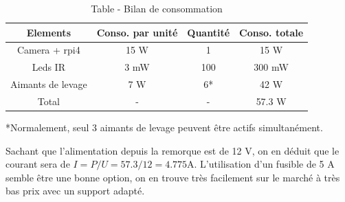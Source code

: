 \begin{table}[H]
    \begin{center}
        \caption{Table - Bilan de consommation}
        \begin{tabular}{|c|c|c|c|}
            Elements            & Conso. par unité   & Quantité & Conso. totale        \\ \hline
            Camera + \Gls{rpi4} & 15 \si{\watt}      & 1        & 15    \si{\watt}     \\
            Leds IR             & 3 \si{\milli\watt} & 100      & 300 \si{\milli\watt} \\
            Aimants de levage   & 7 \si{\watt}       & 6*       & 42 \si{\watt}        \\
            Total               & -                  & -        & 57.3 \si{\watt}      \\
        \end{tabular}
    \end{center}

    *Normalement, seul 3 aimants de levage peuvent être actifs simultanément.
\end{table}

Sachant que l'alimentation depuis la remorque est de 12 \si{\volt}, on en déduit que le courant sera de \(I = P/U = 57.3/12 = 4.775 \si{\ampere} \).
L'utilisation d'un fusible de 5 \si{\ampere} semble être une bonne option, on en trouve très facilement sur le marché à très bas prix avec un support adapté.